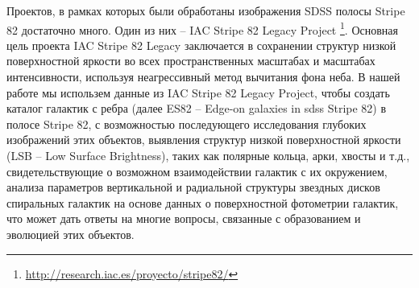 Проектов, в рамках которых были обработаны изображения SDSS полосы Stripe 82 достаточно много. Один из них -- IAC Stripe 82 Legacy Project \footnote{\url{http://research.iac.es/proyecto/stripe82/}}. Основная цель проекта IAC Stripe 82 Legacy заключается в сохранении структур низкой поверхностной яркости во всех пространственных масштабах и масштабах интенсивности, используя неагрессивный метод вычитания фона неба. В нашей работе мы использем данные из IAC Stripe 82 Legacy Project, чтобы создать каталог галактик с ребра (далее ES82 – Edge-on galaxies in sdss Stripe 82) в полосе Stripe 82, с возможностью последующего исследования глубоких изображений этих объектов, выявления структур низкой поверхностной яркости (LSB – Low Surface Brightness), таких как полярные кольца, арки, хвосты и т.д., свидетельствующие о возможном взаимодействии галактик с их окружением, анализа параметров вертикальной и радиальной структуры звездных дисков спиральных галактик на основе данных о поверхностной фотометрии галактик, что может дать ответы на многие вопросы, связанные с образованием и эволюцией этих объектов. 




